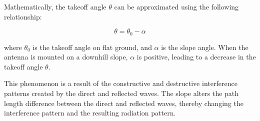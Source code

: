 Mathematically, the takeoff angle $\theta$ can be approximated using the following relationship:

\[
\theta = \theta_0 - \alpha
\]

where $\theta_0$ is the takeoff angle on flat ground, and $\alpha$ is the slope angle. When the antenna is mounted on a downhill slope, $\alpha$ is positive, leading to a decrease in the takeoff angle $\theta$.

This phenomenon is a result of the constructive and destructive interference patterns created by the direct and reflected waves. The slope alters the path length difference between the direct and reflected waves, thereby changing the interference pattern and the resulting radiation pattern.

